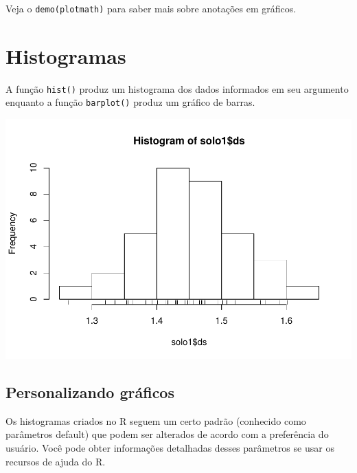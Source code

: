 \documentclass[
]{book}
\newenvironment{Shaded}{\begin{snugshade}}{\end{snugshade}}
\newcommand{\KeywordTok}[1]{\textcolor[rgb]{0.13,0.29,0.53}{\textbf{#1}}}
\newcommand{\NormalTok}[1]{#1}
\newcommand{\OperatorTok}[1]{\textcolor[rgb]{0.81,0.36,0.00}{\textbf{#1}}}
\begin{document}
Veja o \texttt{demo(plotmath)} para saber mais sobre anotações em gráficos.

\hypertarget{histogramas}{%
\section{Histogramas}\label{histogramas}}

A função \texttt{hist()} produz um histograma dos dados informados em seu argumento enquanto a função \texttt{barplot()} produz um gráfico de barras.

\begin{Shaded}
\end{Shaded}

\includegraphics{TudodoR_files/figure-latex/unnamed-chunk-167-1.pdf}

\hypertarget{personalizando-gruxe1ficos}{%
\subsection{Personalizando gráficos}\label{personalizando-gruxe1ficos}}

Os histogramas criados no R seguem um certo padrão (conhecido como parâmetros
default) que podem ser alterados de acordo com a preferência do usuário. Você pode obter
informações detalhadas desses parâmetros se usar os recursos de ajuda do R.
\end{document}

